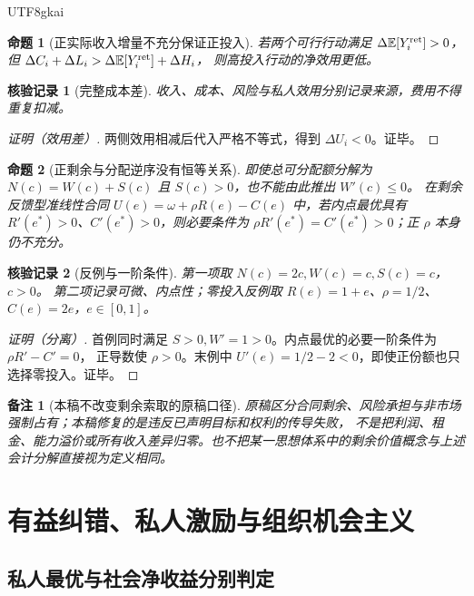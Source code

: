 \documentclass[12pt,a4paper,openany]{report}
\newtheorem{proposition}{命题}[chapter]
\newtheorem{remark}{备注}[chapter]
\newtheorem{Certificate}{核验记录}[chapter]
\newcommand{\EE}{\mathbb E}
\newcommand{\Original}{原稿}
\begin{document}
\begin{CJK*}{UTF8}{gkai}
\begin{proposition}[正实际收入增量不充分保证正投入]
\label{prop:net-incentive}
若两个可行行动满足 $\Delta\EE[Y_i^{\rm ret}]>0$，但
$\Delta C_i+\Delta L_i>\Delta\EE[Y_i^{\rm ret}]+\Delta H_i$，
则高投入行动的净效用更低。
\end{proposition}
\begin{Certificate}[完整成本差]
收入、成本、风险与私人效用分别记录来源，费用不得重复扣减。
\end{Certificate}
\begin{proof}[证明（效用差）]
两侧效用相减后代入严格不等式，得到 $\Delta U_i<0$。证毕。
\end{proof}

\begin{proposition}[正剩余与分配逆序没有恒等关系]
\label{prop:surplus-separation}
即使总可分配额分解为 $N(c)=W(c)+S(c)$ 且 $S(c)>0$，也不能由此推出 $W'(c)\le0$。
在剩余反馈型准线性合同 $U(e)=\omega+\rho R(e)-C(e)$ 中，若内点最优具有
$R'(e^*)>0$、$C'(e^*)>0$，则必要条件为 $\rho R'(e^*)=C'(e^*)>0$；正 $\rho$ 本身仍不充分。
\end{proposition}
\begin{Certificate}[反例与一阶条件]
第一项取 $N(c)=2c,W(c)=c,S(c)=c$，$c>0$。
第二项记录可微、内点性；零投入反例取 $R(e)=1+e$、$\rho=1/2$、$C(e)=2e$，$e\in[0,1]$。
\end{Certificate}
\begin{proof}[证明（分离）]
首例同时满足 $S>0,W'=1>0$。内点最优的必要一阶条件为 $\rho R'-C'=0$，
正导数使 $\rho>0$。末例中 $U'(e)=1/2-2<0$，即使正份额也只选择零投入。证毕。
\end{proof}

\begin{remark}[本稿不改变剩余索取的原稿口径]
\Original 区分合同剩余、风险承担与非市场强制占有；本稿修复的是违反已声明目标和权利的传导失败，
不是把利润、租金、能力溢价或所有收入差异归零。也不把某一思想体系中的剩余价值概念与上述
会计分解直接视为定义相同\cite[章节“共同形成的剩余、价值归属及其与规范治理的分离”]{SourceMarket}。
\end{remark}

\chapter{有益纠错、私人激励与组织机会主义}
\label{chap:correction}

\section{私人最优与社会净收益分别判定}


\end{CJK*}
\end{document}

